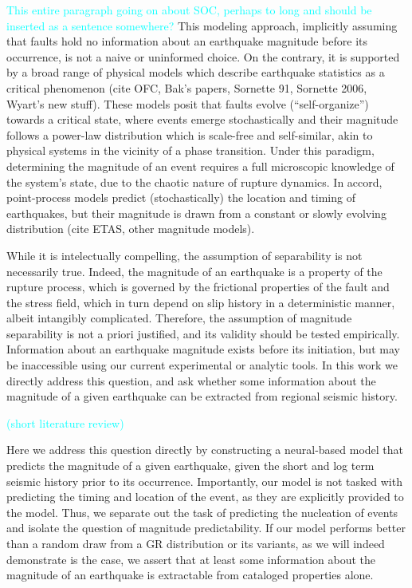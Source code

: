 \documentclass[pdflatex]{sn-jnl}
\newcommand{\neri}[1]{{\textcolor{cyan}{#1}}}
\begin{document}
\neri{This entire paragraph going on about SOC, perhaps to long and should be inserted as a sentence somewhere?}
This modeling approach, implicitly assuming that faults hold no information about an earthquake magnitude before its occurrence, is not a naive or uninformed choice. On the contrary, it is supported by a broad range of physical models which describe earthquake statistics as a critical phenomenon (cite OFC, Bak's papers, Sornette 91, Sornette 2006, Wyart's new stuff). These models posit that faults evolve (``self-organize'') towards a critical state, where events emerge stochastically and their magnitude follows a power-law distribution which is scale-free and self-similar, akin to physical systems in the vicinity of a phase transition. Under this paradigm, determining the magnitude of an event requires a full microscopic knowledge of the system's state, due to the chaotic nature of rupture dynamics. In accord, point-process models predict (stochastically) the location and timing of earthquakes, but their magnitude is drawn from a constant or slowly evolving distribution (cite ETAS, other magnitude models). 

While it is intelectually compelling, the assumption of separability is not necessarily true. Indeed, the magnitude of an earthquake is a property of the rupture process, which is governed by the frictional properties of the fault and the stress field, which in turn depend on slip history in a deterministic manner, albeit intangibly complicated. Therefore, the assumption of magnitude separability is not a priori justified, and its validity should be tested empirically. Information about an earthquake magnitude exists before its initiation, but may be inaccessible using our current experimental or analytic tools. In this work we directly address this question, and ask whether some information about the magnitude of a given earthquake can be extracted from regional seismic history.

\neri{(short literature review)}

Here we address this question directly by constructing a neural-based model that predicts the magnitude of a given earthquake, given the short and log term seismic history prior to its occurrence. Importantly, our model is not tasked with predicting the timing and location of the event, as they are explicitly provided to the model. Thus, we separate out the task of predicting the nucleation of events and isolate the question of magnitude predictability. If our model performs better than a random draw from a GR distribution or its variants, as we will indeed demonstrate is the case, we assert that at least some information about the magnitude of an earthquake is extractable from cataloged properties alone. 
\end{document}

